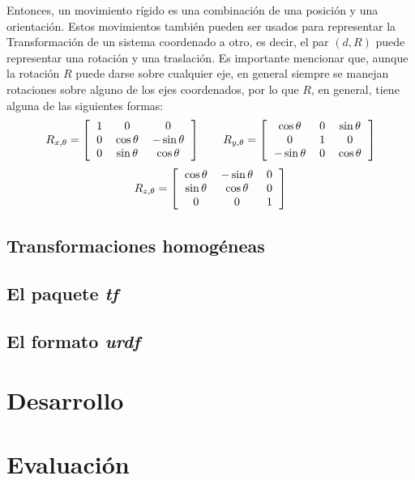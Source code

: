 \documentclass[letterpaper,12pt]{article}
\begin{document}
Entonces, un movimiento rígido es una combinación de una posición y una orientación. Estos movimientos también pueden ser usados para representar la Transformación de un sistema coordenado a otro, es decir, el par $(d, R)$ puede representar una rotación y una traslación. Es importante mencionar que, aunque la rotación $R$ puede darse sobre cualquier eje, en general siempre se manejan rotaciones sobre alguno de los ejes coordenados, por lo que $R$, en general, tiene alguna de las siguientes formas:
\[R_{x,\theta} = \left[
    \begin{tabular}{ccc}
      1 & 0 & 0\\
      0 & $\cos \theta$ & $-\sin \theta$\\
      0 & $\sin \theta$ & $\cos \theta$
    \end{tabular}
  \right]\qquad
  R_{y,\theta} = \left[
    \begin{tabular}{ccc}
      $\cos\theta$ & 0 & $\sin\theta$\\
      0 & 1 & 0\\
      $-\sin\theta$ & 0 & $\cos\theta$
    \end{tabular}
  \right]
\]
\[R_{z,\theta} = \left[
    \begin{tabular}{ccc}
      $\cos \theta$ & $-\sin \theta$ & 0\\
      $\sin \theta$ & $\cos \theta$  & 0\\
      0 & 0 & 1
    \end{tabular}
  \right]\]

\subsection{Transformaciones homogéneas}
\subsection{El paquete \textit{tf}}
\subsection{El formato \textit{urdf}}

\section{Desarrollo}

\section{Evaluación}
\end{document}
